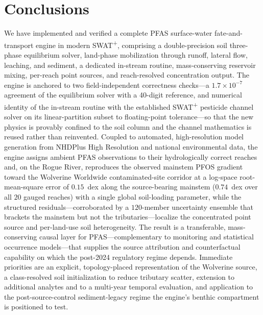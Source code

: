 \section{Conclusions}\label{sec:conclusions}
We have implemented and verified a complete PFAS surface-water fate-and-transport engine in modern SWAT\textsuperscript{+}, comprising a double-precision soil three-phase equilibrium solver, land-phase mobilization through runoff, lateral flow, leaching, and sediment, a dedicated in-stream routine, mass-conserving reservoir mixing, per-reach point sources, and reach-resolved concentration output. The engine is anchored to two field-independent correctness checks---a $1.7\times10^{-7}$ agreement of the equilibrium solver with a 40-digit reference, and numerical identity of the in-stream routine with the established SWAT\textsuperscript{+} pesticide channel solver on its linear-partition subset to floating-point tolerance---so that the new physics is provably confined to the soil column and the channel mathematics is reused rather than reinvented. Coupled to automated, high-resolution model generation from NHDPlus High Resolution and national environmental data, the engine assigns ambient PFAS observations to their hydrologically correct reaches and, on the Rogue River, reproduces the observed mainstem PFOS gradient toward the Wolverine Worldwide contaminated-site corridor at a log-space root-mean-square error of $0.15$~dex along the source-bearing mainstem ($0.74$~dex over all $20$ gauged reaches) with a single global soil-loading parameter, while the structured residuals---corroborated by a $120$-member uncertainty ensemble that brackets the mainstem but not the tributaries---localize the concentrated point source and per-land-use soil heterogeneity. The result is a transferable, mass-conserving causal layer for PFAS---complementary to monitoring and statistical occurrence models---that supplies the source attribution and counterfactual capability on which the post-2024 regulatory regime depends. Immediate priorities are an explicit, topology-placed representation of the Wolverine source, a class-resolved soil initialization to reduce tributary scatter, extension to additional analytes and to a multi-year temporal evaluation, and application to the post-source-control sediment-legacy regime the engine's benthic compartment is positioned to test.
